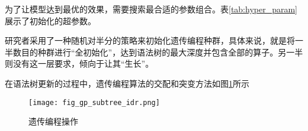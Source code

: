 为了让模型达到最优的效果，需要搜索最合适的参数组合。表\ref{tab:hyper_param}展示了初始化的超参数。



研究者采用了一种随机对半分的策略来初始化遗传编程种群，具体来说，就是将一半数目的种群进行“全初始化”，达到语法树的最大深度并包含全部的算子。另一半则没有这一层要求，倾向于让其“生长”。

在语法树更新的过程中，遗传编程算法的交配和突变方法如图\ref{fig:gp_subtree_idr}所示

\begin{figure}[H]
    \texttt{[image: fig\_gp\_subtree\_idr.png]}
    \caption{遗传编程操作}
    \label{fig:gp_subtree_idr}
\end{figure}


